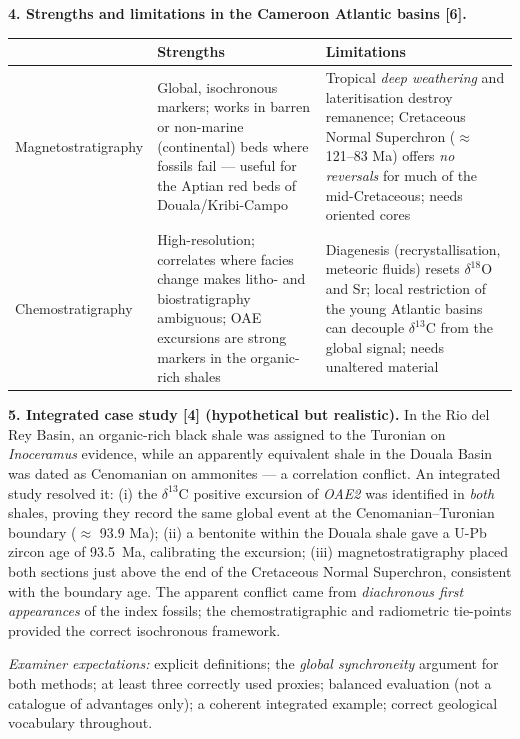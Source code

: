 \documentclass[11pt]{article}
\begin{document}
\begin{corrige}
\textbf{4. Strengths and limitations in the Cameroon Atlantic basins [6].}
\begin{center}
\begin{tabularx}{\linewidth}{|l|X|X|}\hline
\rowcolor{popblueL}
& \textbf{Strengths} & \textbf{Limitations} \\ \hline
Magnetostratigraphy & Global, isochronous markers; works in barren or non-marine (continental) beds where fossils fail — useful for the Aptian red beds of Douala/Kribi-Campo & Tropical \emph{deep weathering} and lateritisation destroy remanence; Cretaceous Normal Superchron ($\approx$ 121--83 Ma) offers \emph{no reversals} for much of the mid-Cretaceous; needs oriented cores \\ \hline
Chemostratigraphy & High-resolution; correlates where facies change makes litho- and biostratigraphy ambiguous; OAE excursions are strong markers in the organic-rich shales & Diagenesis (recrystallisation, meteoric fluids) resets $\delta^{18}$O and Sr; local restriction of the young Atlantic basins can decouple $\delta^{13}$C from the global signal; needs unaltered material \\ \hline
\end{tabularx}
\end{center}

\textbf{5. Integrated case study [4] (hypothetical but realistic).}
In the Rio del Rey Basin, an organic-rich black shale was assigned to the Turonian on \emph{Inoceramus} evidence, while an apparently equivalent shale in the Douala Basin was dated as Cenomanian on ammonites — a correlation conflict. An integrated study resolved it: (i) the $\delta^{13}$C positive excursion of \emph{OAE2} was identified in \emph{both} shales, proving they record the same global event at the Cenomanian--Turonian boundary ($\approx$ 93.9 Ma); (ii) a bentonite within the Douala shale gave a U-Pb zircon age of \SI{93.5}{Ma}, calibrating the excursion; (iii) magnetostratigraphy placed both sections just above the end of the Cretaceous Normal Superchron, consistent with the boundary age. The apparent conflict came from \emph{diachronous first appearances} of the index fossils; the chemostratigraphic and radiometric tie-points provided the correct isochronous framework.

\emph{Examiner expectations:} explicit definitions; the \emph{global synchroneity} argument for both methods; at least three correctly used proxies; balanced evaluation (not a catalogue of advantages only); a coherent integrated example; correct geological vocabulary throughout.
\end{corrige}
\end{document}
